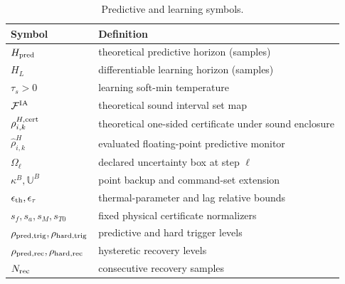 \begin{table}[t]
\caption{Predictive and learning symbols.}
\label{tab:predictive_symbols}
\centering\normalsize
\begin{tabular}{@{}>{\raggedright\arraybackslash}p{}>{\raggedright\arraybackslash}p{}@{}}
\toprule
Symbol & Definition \\
\midrule
$H_{\rm pred}$ & theoretical predictive horizon (samples) \\
$H_L$ & differentiable learning horizon (samples) \\
$\tau_s>0$ & learning soft-min temperature \\
$\mathcal F^{\rm IA}$ & theoretical sound interval set map \\
$\rho_{i,k}^{H,{\rm cert}}$ & theoretical one-sided certificate under sound enclosure \\
$\widehat{\rho}_{i,k}^{H}$ & evaluated floating-point predictive monitor \\
$\Omega_\ell$ & declared uncertainty box at step $\ell$ \\
$\kappa^B,\mathbb U^B$ & point backup and command-set extension \\
$\epsilon_{\rm th},\epsilon_\tau$ & thermal-parameter and lag relative bounds \\
$s_f,s_a,s_M,s_{T0}$ & fixed physical certificate normalizers \\
$\rho_{\rm pred,trig},\rho_{\rm hard,trig}$ & predictive and hard trigger levels \\
$\rho_{\rm pred,rec},\rho_{\rm hard,rec}$ & hysteretic recovery levels \\
$N_{\rm rec}$ & consecutive recovery samples \\
\bottomrule
\end{tabular}
\end{table}

